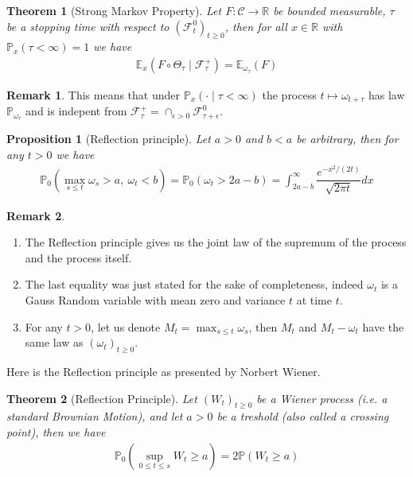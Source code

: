 \documentclass[11pt,a4paper, final]{article}
\newtheorem{thm}{Theorem}[section]
\newtheorem{prop}{Proposition}[section]
\theoremstyle{definition}
\newtheorem{rem}{Remark}[section]
\begin{document}
\begin{thm}[Strong Markov Property] Let $F: \mathcal{C} \to \mathbb{R}$ be bounded measurable, $\tau$ be a stopping time with respect to $(\mathcal{F}_t^0)_{t \geq 0}$, then for all $x \in \mathbb{R}$ with $\mathbb{P}_x( \tau < \infty) =1$ we have 
\begin{align*}
\mathbb{E}_x( F \circ \Theta_\tau  \mid \mathcal{F}_\tau^+) = \mathbb{E}_{\omega_\tau} ( F)
\end{align*}
\end{thm}
\begin{rem} This means that under $\mathbb{P}_x(  \cdot \mid \tau < \infty)$ the process $t \mapsto \omega_{t + \tau}$ has law $\mathbb{P}_{ \omega_\tau}$ and is indepent from $\mathcal{F}_\tau^+ = \cap_{ \epsilon >0} \mathcal{F}_{\tau + \epsilon}^0$.
\end{rem}
\newpage
\begin{prop}[Reflection principle] Let $a>0$ and $b<a$ be arbitrary, then for any $t>0$ we have 
\begin{align*}
\mathbb{P}_0 \left( \max_{s \leq t} \omega_s >a, \ \omega_t < b \right) = \mathbb{P}_0( \omega_t > 2a-b) = \int_{2a-b}^\infty \dfrac{e^{-x^2/(2t)}}{\sqrt{2 \pi t}} dx 
\end{align*}
\end{prop}
\begin{rem} \
\begin{enumerate}
\item The Reflection principle gives us the joint law of the supremum of the process and the process itself. 
\item The last equality was just stated for the sake of completeness, indeed $\omega_t$ is a Gauss Random variable with mean zero and variance $t$ at time $t$. 
\item For any $t>0$, let us denote $M_t= \max_{s \leq t} \omega_s$, then $M_t$ and $M_t- \omega_t$ have the same law as $(\omega_t)_{t \geq 0}$. 
\end{enumerate}
\end{rem}
\noindent Here is the Reflection principle as presented by Norbert Wiener.
\begin{thm}[Reflection Principle] Let $(W_t)_{t \geq 0}$ be a Wiener process (i.e. a standard Brownian Motion), and let $a>0$ be a treshold (also called a crossing point), then we have 
\begin{align*}
\mathbb{P}_0 \left( \sup_{0 \leq t \leq s } W_t \geq a \right) = 2 \mathbb{P}(  W_t \geq a)
\end{align*} 
\end{thm}
\end{document}
